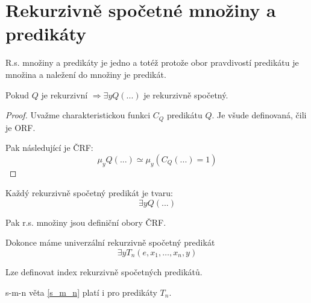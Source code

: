 \section{\texorpdfstring{Rekurzivně spočetné množiny a predikáty}{Rekurzivně spočetné množiny a predikáty}}
\vspace{5mm}
\large

\begin{note}
	R.s. množiny a predikáty je jedno a totéž protože obor pravdivostí predikátu je množina a naležení do množiny je predikát.
\end{note}

\begin{lemma}[$\exists Q$ r.s]
	Pokud $Q$ je rekurzivní $\Rightarrow \exists y Q(...)$ je rekurzivně spočetný.
\end{lemma}
\begin{proof}
	Uvažme charakteristickou funkci $C_Q$ predikátu $Q$.
	Je všude definovaná, čili je ORF.

	Pak následující je ČRF:
	\[ \mu_y Q(...) \simeq \mu_y (C_Q(...) = 1) \]
\end{proof}

\begin{theorem}\label{univ_predic}
	Každý rekurzivně spočetný predikát je tvaru:
	\[ \exists y Q(...) \]

	Pak r.s. množiny jsou definiční obory ČRF.

	Dokonce máme univerzální rekurzivně spočetný predikát
	\[ \exists y T_n(e, x_1, \ldots, x_n, y) \]
\end{theorem}

\begin{consequence}
	Lze definovat index rekurzivně spočetných predikátů.
\end{consequence}

\begin{note}
	s-m-n věta \cref{s_m_n} platí i pro predikáty $T_n$.
\end{note}

